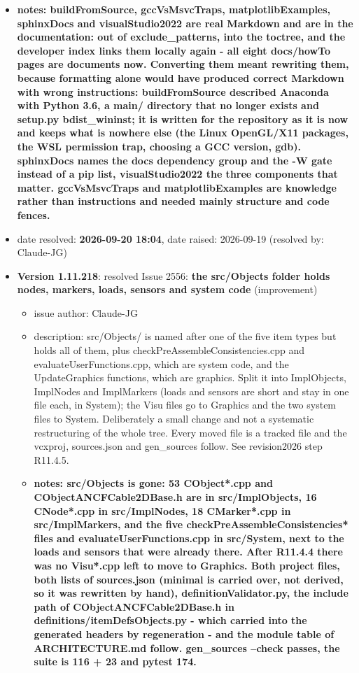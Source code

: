 \begin{itemize}
\begin{itemize}
\begin{itemize}
    \item {\bf notes: buildFromSource, gccVsMsvcTraps, matplotlibExamples, sphinxDocs and visualStudio2022 are real Markdown and are in the documentation: out of exclude\_patterns, into the toctree, and the developer index links them locally again - all eight docs/howTo pages are documents now. Converting them meant rewriting them, because formatting alone would have produced correct Markdown with wrong instructions: buildFromSource described Anaconda with Python 3.6, a main/ directory that no longer exists and setup.py bdist\_wininst; it is written for the repository as it is now and keeps what is nowhere else (the Linux OpenGL/X11 packages, the WSL permission trap, choosing a GCC version, gdb). sphinxDocs names the docs dependency group and the -W gate instead of a pip list, visualStudio2022 the three components that matter. gccVsMsvcTraps and matplotlibExamples are knowledge rather than instructions and needed mainly structure and code fences.}
    \item   date resolved: {\bf 2026-09-20 18:04},
date raised: 2026-09-19 (resolved by: Claude-JG)
  \ei
  \item[] {\bf Version 1.11.218}:  resolved Issue 2556: {\bf the src/Objects folder holds nodes, markers, loads, sensors and system code}
(improvement)
\vspace{-6pt}   \begin{itemize} \setlength\itemsep{-1pt}
    \item issue author: Claude-JG
    \item {description: src/Objects/ is named after one of the five item types but holds all of them, plus checkPreAssembleConsistencies.cpp and evaluateUserFunctions.cpp, which are system code, and the UpdateGraphics functions, which are graphics. Split it into ImplObjects, ImplNodes and ImplMarkers (loads and sensors are short and stay in one file each, in System); the Visu files go to Graphics and the two system files to System. Deliberately a small change and not a systematic restructuring of the whole tree. Every moved file is a tracked file and the vcxproj, sources.json and gen\_sources follow. See revision2026 step R11.4.5.}
    \item {\bf notes: src/Objects is gone: 53 CObject*.cpp and CObjectANCFCable2DBase.h are in src/ImplObjects, 16 CNode*.cpp in src/ImplNodes, 18 CMarker*.cpp in src/ImplMarkers, and the five checkPreAssembleConsistencies* files and evaluateUserFunctions.cpp in src/System, next to the loads and sensors that were already there. After R11.4.4 there was no Visu*.cpp left to move to Graphics. Both project files, both lists of sources.json (minimal is carried over, not derived, so it was rewritten by hand), definitionValidator.py, the include path of CObjectANCFCable2DBase.h in definitions/itemDefsObjects.py - which carried into the generated headers by regeneration - and the module table of ARCHITECTURE.md follow. gen\_sources --check passes, the suite is 116 + 23 and pytest 174.}

\end{itemize}
\end{itemize}
\end{itemize}
\end{itemize}

